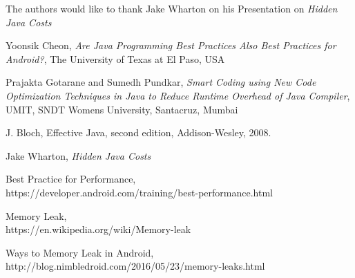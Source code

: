 \documentclass[journal]{IEEEtran}
\begin{document}
The authors would like to thank Jake Wharton on his Presentation on \emph{Hidden Java Costs}

\begin{thebibliography}{1}

\bibitem{}
Yoonsik Cheon, \emph{Are Java Programming Best Practices Also Best Practices for Android?}, The University of Texas at El Paso, USA

\bibitem{}
Prajakta Gotarane and Sumedh Pundkar, \emph{Smart Coding using New Code Optimization Techniques in Java to Reduce Runtime Overhead of Java Compiler}, UMIT, SNDT Womens University, Santacruz, Mumbai

\bibitem{}
J. Bloch, Effective Java, second edition, Addison-Wesley, 2008.

\bibitem{}
Jake Wharton, \emph{Hidden Java Costs}

\bibitem{}
Best Practice for Performance,\\
https://developer.android.com/training/best-performance.html 

\bibitem{}
Memory Leak,\\
https://en.wikipedia.org/wiki/Memory-leak

\bibitem{}
Ways to Memory Leak in Android,\\
http://blog.nimbledroid.com/2016/05/23/memory-leaks.html

\end{thebibliography}
\end{document}
